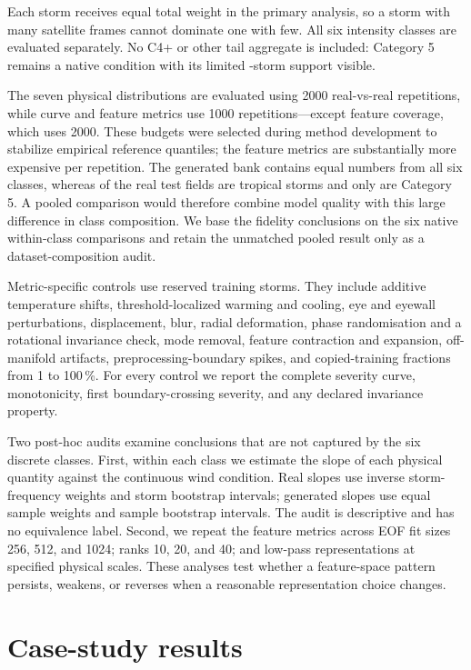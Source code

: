 \documentclass[gmd, manuscript]{copernicus}
\begin{document}
Each storm receives equal total weight in the primary analysis, so a storm with many
satellite frames cannot dominate one with few. All six intensity classes are evaluated
separately. No C4+ or other tail aggregate is included: Category 5 remains a native
condition with its limited \CfiveStorms-storm support visible.

The seven physical distributions are evaluated using 2000 real-vs-real repetitions, while curve and feature metrics use 1000 repetitions---except feature coverage, which uses
2000. These budgets were selected during method development to stabilize empirical
reference quantiles; the feature metrics are substantially more expensive per
repetition. The generated bank contains
equal numbers from all six classes, whereas \RealTropicalStormShare{} of the real test
fields are tropical storms and only \RealCategoryFiveShare{} are Category 5. A pooled
comparison would therefore
combine model quality with this large difference in class composition. We base the
fidelity conclusions on the six native within-class comparisons and retain the
unmatched pooled result only as a dataset-composition audit.

Metric-specific controls use reserved training storms. They include additive
temperature shifts, threshold-localized warming and cooling, eye and eyewall
perturbations, displacement, blur, radial
deformation, phase randomisation and a rotational invariance check, mode removal,
feature contraction and expansion, off-manifold artifacts, preprocessing-boundary
spikes, and copied-training fractions from 1 to 100\,\%. For every control we report
the complete severity curve, monotonicity, first boundary-crossing severity, and any
declared invariance property.

Two post-hoc audits examine conclusions that are not captured by the six discrete
classes. First, within each class we estimate the slope of each physical quantity
against the continuous wind condition. Real slopes use inverse storm-frequency
weights and storm bootstrap intervals; generated slopes use equal sample weights and
sample bootstrap intervals. The audit is descriptive and has no equivalence label.
Second, we repeat the feature metrics across EOF fit sizes 256, 512, and 1024; ranks
10, 20, and 40; and low-pass representations at specified physical scales. These
analyses test whether a feature-space pattern persists, weakens, or reverses when a
reasonable representation choice changes.

\section{Case-study results}
\label{sec:results}
\end{document}
